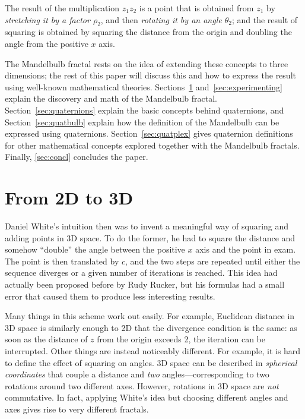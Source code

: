 \documentclass{article}
\begin{document}
\noindent
The result of the multiplication $z_1 z_2$ is a point that is obtained
from $z_1$ by \emph{stretching it by a factor $\rho_2$}, and
then \emph{rotating it by an angle $\theta_2$}; and the result of
squaring is obtained by squaring the distance from the origin and
doubling the angle from the positive $x$ axis.

The Mandelbulb fractal rests on the idea of extending these concepts
to three dimensions; the rest of this paper will discuss this and how
to express the result using well-known mathematical theories.
Sections~\ref{sec:2d-3d} and~\ref{sec:experimenting} explain the
discovery and math of the Mandelbulb fractal.
Section~\ref{sec:quaternions} explain the basic concepts behind
quaternions, and Section~\ref{sec:quatbulb} explain how the definition
of the Mandelbulb can be expressed using quaternions.
Section~\ref{sec:quatplex} gives quaternion definitions for other
mathematical concepts explored together with the Mandelbulb fractals.
Finally, \ref{sec:concl} concludes the paper.


\section{From 2D to 3D}
\label{sec:2d-3d}

Daniel White's intuition then was to invent a meaningful way of squaring
and adding points in 3D space.  To do the former, he had to square
the distance and somehow ``double'' the angle between the positive $x$
axis and the point in exam.  The point is then translated by $c$, and
the two steps are repeated until either the sequence diverges or a given
number of iterations is reached.  This idea had actually been proposed
before by Rudy Rucker, but his formulas had a small error that caused
them to produce less interesting results.

Many things in this scheme work out easily.  For example, Euclidean
distance in 3D space is similarly enough to 2D that the divergence
condition is the same: as soon as the distance of $z$ from the origin
exceeds 2, the iteration can be interrupted.  Other things are instead
noticeably different.  For example, it is hard to define the effect of
squaring on angles.  3D space can be described in \emph{spherical
  coordinates} that couple a distance and \emph{two}
angles---corresponding to two rotations around two different axes.
However, rotations in 3D space are \emph{not} commutative.  In fact,
applying White's idea but choosing different angles and axes gives
rise to very different fractals.
\end{document}
